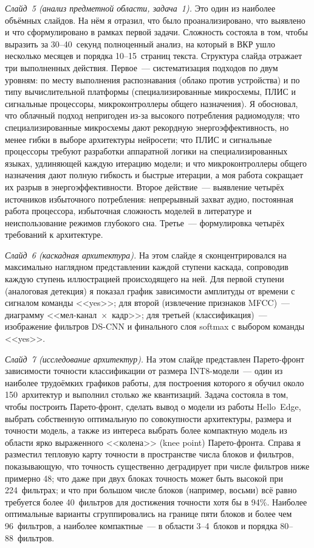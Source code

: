 \textit{Слайд~5 (анализ предметной области, задача~1).} Это один из
наиболее объёмных слайдов. На нём я отразил, что было проанализировано,
что выявлено и что сформулировано в рамках первой задачи. Сложность
состояла в том, чтобы выразить за 30--40~секунд полноценный анализ, на
который в ВКР ушло несколько месяцев и порядка 10--15~страниц текста.
Структура слайда отражает три выполненных действия. Первое~---
систематизация подходов по двум уровням: по месту выполнения
распознавания (облако против устройства) и по типу вычислительной
платформы (специализированные микросхемы, ПЛИС и сигнальные процессоры,
микроконтроллеры общего назначения). Я обосновал, что облачный подход
непригоден из-за высокого потребления радиомодуля; что специализированные
микросхемы дают рекордную энергоэффективность, но менее гибки в выборе
архитектуры нейросети; что ПЛИС и сигнальные процессоры требуют
разработки аппаратной логики на специализированных языках, удлиняющей
каждую итерацию модели; и что микроконтроллеры общего назначения дают
полную гибкость и быстрые итерации, а моя работа сокращает их разрыв в
энергоэффективности. Второе действие~--- выявление четырёх источников
избыточного потребления: непрерывный захват аудио, постоянная работа
процессора, избыточная сложность моделей в литературе и неиспользование
режимов глубокого сна. Третье~--- формулировка четырёх требований к
архитектуре.

\textit{Слайд~6 (каскадная архитектура).} На этом слайде я
сконцентрировался на максимально наглядном представлении каждой ступени
каскада, сопроводив каждую ступень иллюстрацией происходящего на ней. Для
первой ступени (аналоговая детекция) я показал график зависимости
амплитуды от времени с сигналом команды <<yes>>; для второй (извлечение
признаков MFCC)~--- диаграмму <<мел-канал~$\times$~кадр>>; для третьей
(классификация)~--- изображение фильтров DS-CNN и финального слоя
softmax с выбором команды <<yes>>.

\textit{Слайд~7 (исследование архитектур).} На этом слайде представлен
Парето-фронт зависимости точности классификации от размера INT8-модели~---
один из наиболее трудоёмких графиков работы, для построения которого я
обучил около 150~архитектур и выполнил столько же квантизаций. Задача
состояла в том, чтобы построить Парето-фронт, сделать вывод о модели из
работы Hello~Edge, выбрать собственную оптимальную по совокупности
архитектуры, размера и точности модель, а также из интереса выбрать более
компактную модель из области ярко выраженного <<колена>> (knee point)
Парето-фронта. Справа я разместил тепловую карту точности в пространстве
числа блоков и фильтров, показывающую, что точность существенно
деградирует при числе фильтров ниже примерно 48; что даже при двух блоках
точность может быть высокой при 224~фильтрах; и что при большом числе
блоков (например, восьми) всё равно требуется более 40~фильтров для
достижения точности хотя бы в 94\%. Наиболее оптимальные варианты
сгруппировались на границе пяти блоков и более чем 96~фильтров, а наиболее
компактные~--- в области 3--4~блоков и порядка 80--88~фильтров.


